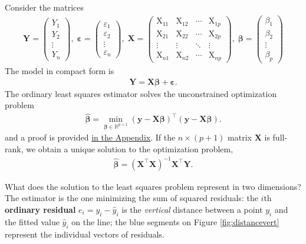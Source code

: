 \documentclass[
  11pt,
  letterpaper,
]{book}
\theoremstyle{definition}
\theoremstyle{definition}
\theoremstyle{definition}
\theoremstyle{definition}
\theoremstyle{remark}
\begin{document}
Consider the matrices
\begin{align*}
\boldsymbol{Y} =
 \begin{pmatrix}
  Y_1 \\
  Y_2 \\
  \vdots \\
  Y_n
 \end{pmatrix} ,
 \;
 \boldsymbol{\varepsilon} =
 \begin{pmatrix}
  \varepsilon_1 \\
  \varepsilon_2 \\
  \vdots \\
  \varepsilon_n
 \end{pmatrix} ,
 \;
\mathbf{X} = \begin{pmatrix}
\mathrm{X}_{11} & \mathrm{X}_{12} & \cdots & \mathrm{X}_{1p} \\
\mathrm{X}_{21} & \mathrm{X}_{22} & \cdots & \mathrm{X}_{2p} \\
\vdots & \vdots & \ddots & \vdots \\
\mathrm{X}_{n1} & \mathrm{X}_{n2} & \cdots & \mathrm{X}_{np}
\end{pmatrix} , \;
\boldsymbol{\beta} =
 \begin{pmatrix}
  \beta_1 \\
  \beta_2 \\
  \vdots \\
  \beta_p
 \end{pmatrix}
\end{align*}
The model in compact form is
\begin{align*}
\boldsymbol{Y} = \mathbf{X} \boldsymbol{\beta} + \boldsymbol{\varepsilon}.
\end{align*}
The ordinary least squares estimator solves the unconstrained optimization problem
\begin{align*}
\widehat{\boldsymbol{\beta}}=\min_{\boldsymbol{\beta} \in \mathbb{R}^{p+1}}(\boldsymbol{y}-\mathbf{X}\boldsymbol{\beta})^\top(\boldsymbol{y}-\mathbf{X}\boldsymbol{\beta}).
\end{align*}
and a proof is provided \protect\hyperlink{ols}{in the Appendix}. If the \(n \times (p+1)\) matrix \(\mathbf{X}\) is full-rank, we obtain a unique solution to the optimization problem,
\begin{align}
\widehat{\boldsymbol{\beta}} = (\mathbf{X}^{\top} \mathbf{X})^{-1} \mathbf{X}^{\top} \boldsymbol{Y}. \label{eq:ols}
\end{align}

What does the solution to the least squares problem represent in two dimensions? The estimator is the one minimizing the sum of squared residuals: the \(i\)th \textbf{ordinary residual} \(e_i = y_i -\widehat{y}_i\) is the \emph{vertical} distance between a point \(y_i\) and the fitted value \(\widehat{y}_i\) on the line; the blue segments on Figure \ref{fig:distancevert} represent the individual vectors of residuals.
\end{document}
